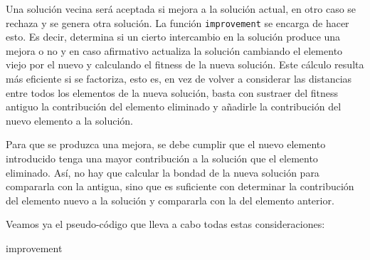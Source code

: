 \documentclass[11pt,a4paper]{article}
\begin{document}
Una solución vecina será aceptada si mejora a la solución actual, en otro caso se rechaza y se genera otra solución. La función \lstinline|improvement| se encarga de hacer esto. Es decir, determina si un cierto intercambio en la solución produce una mejora o no y en caso afirmativo actualiza la solución cambiando el elemento viejo por el nuevo y calculando el fitness de la nueva solución. Este cálculo resulta más eficiente si se factoriza, esto es, en vez de volver a considerar las distancias entre todos los elementos de la nueva solución, basta con sustraer del fitness antiguo la contribución del elemento eliminado y añadirle la contribución del nuevo elemento a la solución. 

Para que se produzca una mejora, se debe cumplir que el nuevo elemento introducido tenga una mayor contribución a la solución que el elemento eliminado. Así, no hay que calcular la bondad de la nueva solución para compararla con la antigua, sino que es suficiente con determinar la contribución del elemento nuevo a la solución y compararla con la del elemento anterior. 

Veamos ya el pseudo-código que lleva a cabo todas estas consideraciones:

\begin{algorithm}[H]
	\caption{\sc improvement}
\end{algorithm}
\newpage
	
\end{document}
